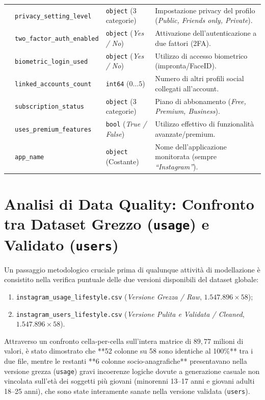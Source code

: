 \begin{table}[H]
{\begin{tabular}{llp{4.2cm}p{6.8cm}}
 & \texttt{privacy\_setting\_level} & \texttt{object} (3 categorie) & Impostazione privacy del profilo (\emph{Public, Friends only, Private}). \\
 & \texttt{two\_factor\_auth\_enabled} & \texttt{object} (\emph{Yes / No}) & Attivazione dell'autenticazione a due fattori (2FA). \\
 & \texttt{biometric\_login\_used} & \texttt{object} (\emph{Yes / No}) & Utilizzo di accesso biometrico (impronta/FaceID). \\
 & \texttt{linked\_accounts\_count} & \texttt{int64} ($0 \dots 5$) & Numero di altri profili social collegati all'account. \\
 & \texttt{subscription\_status} & \texttt{object} (3 categorie) & Piano di abbonamento (\emph{Free, Premium, Business}). \\
 & \texttt{uses\_premium\_features} & \texttt{bool} (\emph{True / False}) & Utilizzo effettivo di funzionalità avanzate/premium. \\
 & \texttt{app\_name} & \texttt{object} (Costante) & Nome dell'applicazione monitorata (sempre \emph{``Instagram''}). \\
\bottomrule
\end{tabular}%
}
\end{table}

\section{Analisi di Data Quality: Confronto tra Dataset Grezzo (\texttt{usage}) e Validato (\texttt{users})}
\label{sec:data_quality_usage_users}

Un passaggio metodologico cruciale prima di qualunque attività di modellazione è consistito nella verifica puntuale delle due versioni disponibili del dataset globale:
\begin{enumerate}
    \item \texttt{instagram\_usage\_lifestyle.csv} (\emph{Versione Grezza / Raw}, $1.547.896 \times 58$);
    \item \texttt{instagram\_users\_lifestyle.csv} (\emph{Versione Pulita e Validata / Cleaned}, $1.547.896 \times 58$).
\end{enumerate}

Attraverso un confronto cella-per-cella sull'intera matrice di $89,77$ milioni di valori, è stato dimostrato che **52 colonne su 58 sono identiche al 100\%** tra i due file, mentre le restanti **6 colonne socio-anagrafiche** presentavano nella versione grezza (\texttt{usage}) gravi incoerenze logiche dovute a generazione casuale non vincolata sull'età dei soggetti più giovani (minorenni 13--17 anni e giovani adulti 18--25 anni), che sono state interamente sanate nella versione validata (\texttt{users}).

